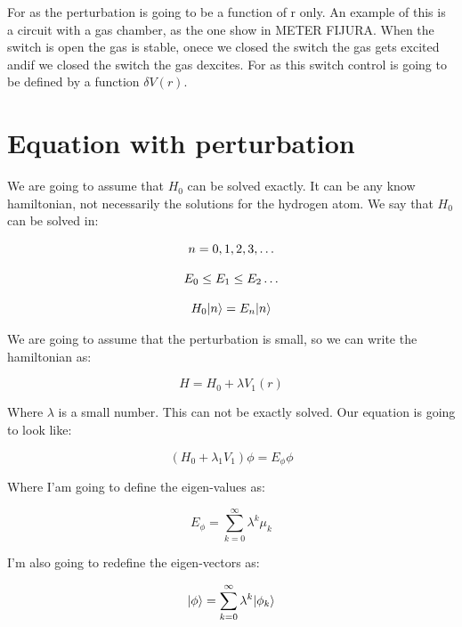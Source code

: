 For as the perturbation is going to be a function of r only. An example of this is a circuit with a gas chamber, as the one show in METER FIJURA. When the switch is open the gas is stable, onece we closed the switch the gas gets excited andif we closed the switch the gas dexcites. For as this switch control is going to be defined by a function $\delta V(r)$.


\section{Equation with perturbation}

We are going to assume that $H_0$ can be solved exactly. It can be any know hamiltonian, not necessarily the solutions for the hydrogen atom. We say that $H_0$ can be solved in:

\begin{equation}
  \begin{array}{c}
    n=0,1,2,3,\dots
    \\

    \\
    E_0 \leq E_1 \leq E_2 \dots
    \\

    \\
    H_0 \lvert n\rangle = E_n \lvert n\rangle
  \end{array}
\end{equation}

We are going to assume that the perturbation is small, so we can write the hamiltonian as:

\begin{equation}
  H = H_0 + \lambda V_1(r)
\end{equation}

Where $\lambda$ is a small number. This can not be exactly solved. Our equation is going to look like:

\begin{equation}
  (H_0+\lambda_1 V_1) \phi = E_\phi\phi
\end{equation}

Where I'am going to define the eigen-values as:

\begin{equation}
  E_\phi =\sum_{k=0}^{\infty} \lambda^k \mu_k
\end{equation}

I'm also going to redefine the eigen-vectors as:

\begin{equation}
  \lvert\phi\rangle = \sum_{k=0}^{\infty} \lambda^k \lvert\phi_k\rangle
\end{equation}

